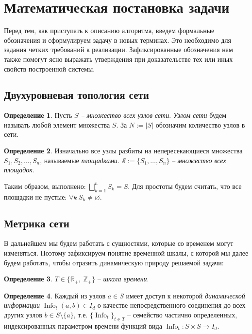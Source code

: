 \documentclass{article}
\theoremstyle{plain}
\theoremstyle{plain}
\theoremstyle{plain}
\theoremstyle{plain}
\theoremstyle{definition}
\newtheorem{definition}{Определение}[section]
\theoremstyle{remark}
\theoremstyle{plain}
\DeclareMathOperator*{\info}{Info}
\begin{document}
\section{Математическая постановка задачи}

Перед тем, как приступать к описанию алгоритма, введем формальные обозначения и сформулируем задачу в новых терминах. Это необходимо для задания четких требований к реализации. Зафиксированные обозначения нам также помогут ясно выражать утверждения при доказательстве тех или иных свойств построенной системы.

\subsection{Двухуровневая топология сети}

\begin{definition}
    Пусть \textit{$S$ – множество всех узлов сети}. \textit{Узлом сети} будем называть любой элемент множества $S$. За $N := |S|$ обозначим количество узлов в сети.
\end{definition}

\begin{definition}
    Изначально все узлы разбиты на непересекающиеся множества $S_1, S_2, \ldots, S_n$, называемые \textit{площадками}. $\mathcal{S} := \{S_1, \ldots, S_n\}$ -- \textit{множество всех площадок}.
\end{definition}

Таким образом, выполнено: $\displaystyle \bigsqcup_{k = 1}^n S_k = S$. Для простоты будем считать, что все площадки не пустые: $\forall k\ S_k \neq \varnothing$.

\subsection{Метрика сети}

В дальнейшем мы будем работать с сущностями, которые со временем могут изменяться. Поэтому зафиксируем понятие временной шкалы, с которой мы далее будем работать, чтобы отразить динамическую природу решаемой задачи:

\begin{definition}
    $T \in \{\mathbb{R}_+,\ \mathbb{Z}_+\}$ -- \textit{шкала времени}.
\end{definition}

\begin{definition}
    Каждый из узлов $a \in S$ имеет доступ к некоторой \textit{динамической информации} $\info_t(a, b) \in I_d$ о качестве непосредственного соединения до всех других узлов $b \in S \setminus \{a\}$, т.е. $\{\info_t\}_{t \in T}$ -- семейство частично определенных, индексированных параметром времени функций вида $\info_t: S \times S \to I_d$.
\end{definition}
\end{document}
